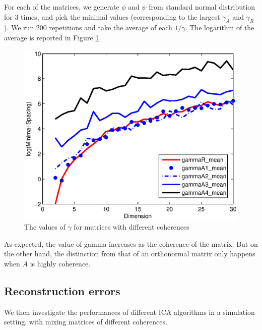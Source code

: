 \documentclass[twoside]{article}
\theoremstyle{definition}
\begin{document}
For each of the matrices, we generate $\phi$ and $\psi$ from standard normal distribution for 3 times, and pick the minimal values (corresponding to the largest $\gamma_A$ and $\gamma_R$).
We run 200 repetitions and take the average of each $1/\gamma$. The logarithm of the average is reported in Figure \ref{fig:miniSpacing}.
\begin{figure}[h]
\label{fig:miniSpacing}
\centering
	\includegraphics[width = \columnwidth]{miniSpacing}
\caption{The values of $\gamma$ for matrices with different coherences}
\end{figure}

As expected, the value of gamma increases as the coherence of the matrix. 
But on the other hand, the distinction from that of an orthonormal matrix only happens when $A$ is highly coherence. 

\subsection{Reconstruction errors}
We then investigate the performances of different ICA algorithms in a simulation setting, with mixing matrices of different coherences. 
\end{document}
